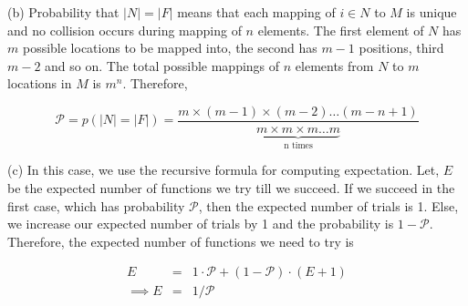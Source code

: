 \documentclass[assign]{article}
\begin{document}
\par (b) Probability that $|N|=|F|$ means that each mapping of $i \in N$ to $M$ is unique and no collision occurs during mapping of $n$ elements. The first element of $N$ has $m$ possible locations to be mapped into, the second has $m-1$ positions, third $m-2$ and so on. The total possible mappings of $n$ elements from $N$ to $m$ locations in $M$ is $m^n$. Therefore,

\begin{equation}
  \mathcal{P} = p(|N| = |F|) = \frac{m\times(m-1)\times(m-2)\ldots(m-n+1)}{\underbrace{m\times m \times m \ldots m}_{\text{n times}} }
\label{prob1}
\end{equation}

\par (c) In this case, we use the recursive formula for computing expectation. Let, $E$ be the expected number of functions we try till we succeed. If we succeed in the first case, which has probability $\mathcal{P}$, then the expected number of trials is 1. Else, we increase our expected number of trials by 1 and the probability is $1-\mathcal{P}$. Therefore, the expected number of functions we need to try is

\vspace{-15pt}
\begin{eqnarray*}
   E &=& 1 \cdot \mathcal{P} + (1-\mathcal{P}) \cdot (E+1) \\
  \implies E  &=& 1/\mathcal{P}
\end{eqnarray*}  
\vspace{-10pt}

%
%
%
%
\end{document}
